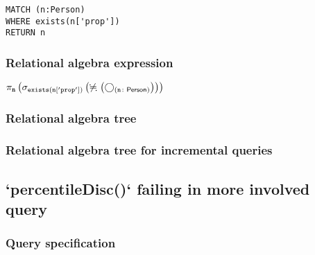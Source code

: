 \begin{lstlisting}
MATCH (n:Person)
WHERE exists(n['prop'])
RETURN n
\end{lstlisting}

\subsubsection*{Relational algebra expression}

$\projection{\var{n}} \left(\selection{\mathtt{exists(n['prop'])}} \left(\alldifferent{} \left(\getvertices{n}{Person}\right)\right)\right)$

\subsubsection*{Relational algebra tree}


\subsubsection*{Relational algebra tree for incremental queries}


\subsection{`percentileDisc()` failing in more involved query}

\subsubsection*{Query specification}

